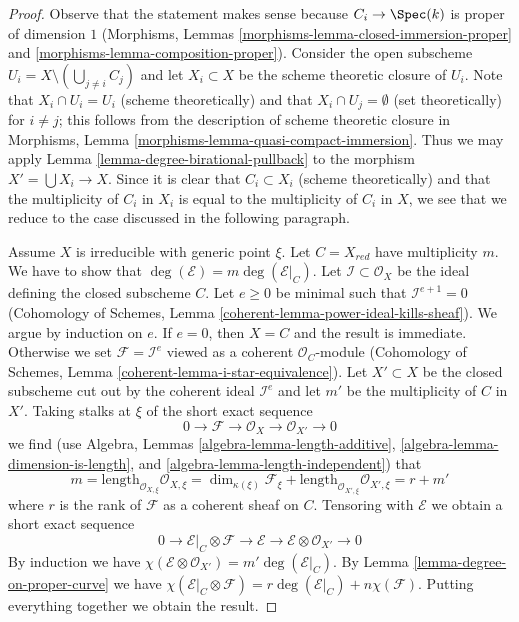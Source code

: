 \begin{proof}
Observe that the statement makes sense because $C_i \to \Spec(k)$
is proper of dimension $1$ (Morphisms, Lemmas
\ref{morphisms-lemma-closed-immersion-proper} and
\ref{morphisms-lemma-composition-proper}). Consider the open subscheme
$U_i = X \setminus (\bigcup_{j \not = i} C_j)$ and let $X_i \subset X$
be the scheme theoretic closure of $U_i$. Note that $X_i \cap U_i = U_i$
(scheme theoretically) and that $X_i \cap U_j = \emptyset$
(set theoretically) for $i \not = j$; this follows from the description
of scheme theoretic closure in
Morphisms, Lemma \ref{morphisms-lemma-quasi-compact-immersion}.
Thus we may apply Lemma \ref{lemma-degree-birational-pullback} to the morphism
$X' = \bigcup X_i \to X$. Since it is clear that $C_i \subset X_i$
(scheme theoretically) and that the multiplicity of $C_i$ in $X_i$ is equal
to the multiplicity of $C_i$ in $X$, we see that we reduce to the case
discussed in the following paragraph.

\medskip\noindent
Assume $X$ is irreducible with generic point $\xi$. Let
$C = X_{red}$ have multiplicity $m$.
We have to show that $\deg(\mathcal{E}) = m \deg(\mathcal{E}|_C)$.
Let $\mathcal{I} \subset \mathcal{O}_X$ be the ideal defining the closed
subscheme $C$. Let $e \geq 0$ be minimal such that $\mathcal{I}^{e + 1} = 0$
(Cohomology of Schemes, Lemma \ref{coherent-lemma-power-ideal-kills-sheaf}).
We argue by induction on $e$. If $e = 0$, then $X = C$ and the result
is immediate. Otherwise we set $\mathcal{F} = \mathcal{I}^e$ viewed as
a coherent $\mathcal{O}_C$-module (Cohomology of Schemes, Lemma
\ref{coherent-lemma-i-star-equivalence}).
Let $X' \subset X$ be the closed subscheme cut out by the
coherent ideal $\mathcal{I}^e$ and let $m'$ be the multiplicity
of $C$ in $X'$. Taking stalks at $\xi$ of the short exact sequence
$$
0 \to \mathcal{F} \to \mathcal{O}_X \to \mathcal{O}_{X'} \to 0
$$
we find (use Algebra, Lemmas \ref{algebra-lemma-length-additive},
\ref{algebra-lemma-dimension-is-length}, and
\ref{algebra-lemma-length-independent}) that
$$
m = \text{length}_{\mathcal{O}_{X, \xi}} \mathcal{O}_{X, \xi}
= \dim_{\kappa(\xi)} \mathcal{F}_\xi +
\text{length}_{\mathcal{O}_{X', \xi}} \mathcal{O}_{X', \xi}
= r + m'
$$
where $r$ is the rank of $\mathcal{F}$ as a coherent sheaf on $C$.
Tensoring with $\mathcal{E}$ we obtain a short exact sequence
$$
0 \to \mathcal{E}|_C \otimes \mathcal{F} \to \mathcal{E} \to
\mathcal{E} \otimes \mathcal{O}_{X'} \to 0
$$
By induction we have
$\chi(\mathcal{E} \otimes \mathcal{O}_{X'}) = m' \deg(\mathcal{E}|_C)$.
By Lemma \ref{lemma-degree-on-proper-curve} we have
$\chi(\mathcal{E}|_C \otimes \mathcal{F}) =
r \deg(\mathcal{E}|_C) + n \chi(\mathcal{F})$.
Putting everything together we obtain the result.
\end{proof}

